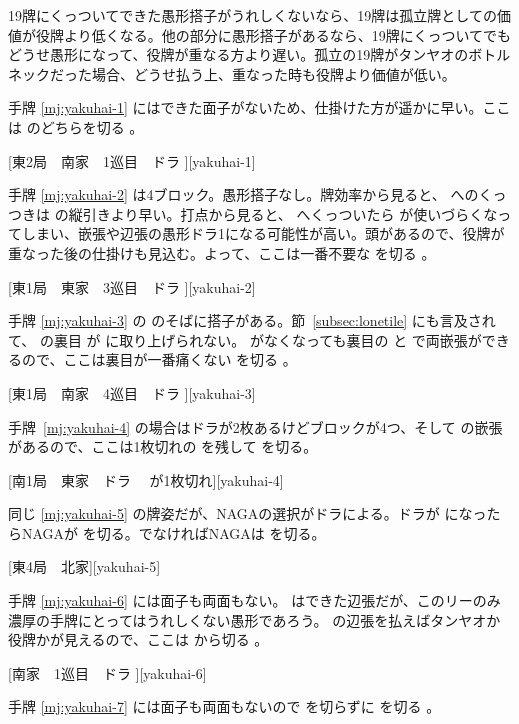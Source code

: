 \documentclass[../nankiru_main.tex]{subfiles}
\begin{document}
19牌にくっついてできた愚形搭子がうれしくないなら、19牌は孤立牌としての価値が役牌より低くなる。他の部分に愚形搭子があるなら、19牌にくっついてでもどうせ愚形になって、役牌が重なる方より遅い。孤立の19牌がタンヤオのボトルネックだった場合、どうせ払う上、重なった時も役牌より価値が低い。

手牌 \ref{mj:yakuhai-1} にはできた面子がないため、仕掛けた方が遥かに早い。ここは  のどちらを切る \citep{yuusee-yakuand1}。

[東2局　南家　1巡目　ドラ ][yakuhai-1]

手牌 \ref{mj:yakuhai-2} は4ブロック。愚形搭子なし。牌効率から見ると、 へのくっつきは  の縦引きより早い。打点から見ると、 へくっついたら  が使いづらくなってしまい、嵌張や辺張の愚形ドラ1になる可能性が高い。頭があるので、役牌が重なった後の仕掛けも見込む。よって、ここは一番不要な  を切る \citep{yuusee-yakuand1}。

[東1局　東家　3巡目　ドラ ][yakuhai-2]

手牌 \ref{mj:yakuhai-3} の  のそばに搭子がある。節~\ref{subsec:lonetile} にも言及されて、 の裏目  が  に取り上げられない。 がなくなっても裏目の  と  で両嵌張ができるので、ここは裏目が一番痛くない  を切る \citep{yuusee-yakuand1}。

[東1局　南家　4巡目　ドラ ][yakuhai-3]

手牌~\ref{mj:yakuhai-4} の場合はドラが2枚あるけどブロックが4つ、そして  の嵌張があるので、ここは1枚切れの  を残して  を切る。

[南1局　東家　ドラ 　が1枚切れ][yakuhai-4]

同じ \ref{mj:yakuhai-5} の牌姿だが、NAGAの選択がドラによる。ドラが  になったらNAGAが  を切る。でなければNAGAは  を切る。

[東4局　北家][yakuhai-5]

手牌 \ref{mj:yakuhai-6} には面子も両面もない。 はできた辺張だが、このリーのみ濃厚の手牌にとってはうれしくない愚形であろう。 の辺張を払えばタンヤオか役牌かが見えるので、ここは  から切る \citep[][p.~15]{zero-teyaku}。

[南家　1巡目　ドラ ][yakuhai-6]

手牌 \ref{mj:yakuhai-7} には面子も両面もないので  を切らずに  を切る \citep{yuusee-yakuand2}。
\end{document}
